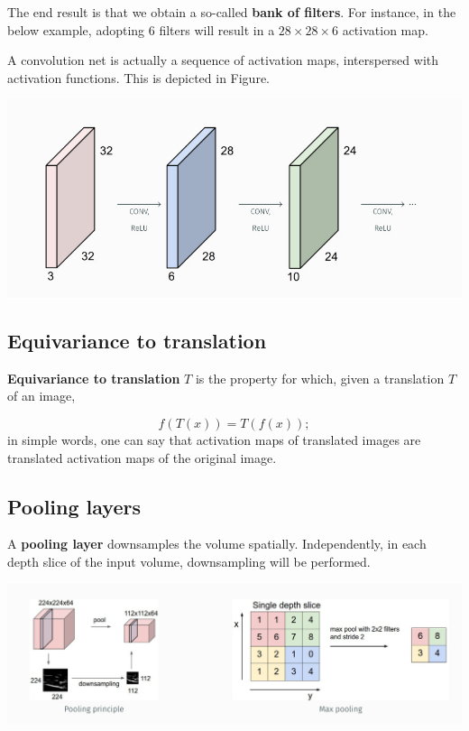 \documentclass[10pt]{report}
\begin{document}
The end result is that we obtain a so-called \textbf{bank of filters}. For
instance, in the below example, adopting \(6\) filters will result in a
\(28 \times 28 \times 6\) activation map.

A convolution net is actually a sequence of activation maps,
interspersed with activation functions. This is depicted in Figure.

\begin{center}
\includegraphics[width=.9\linewidth]{./pics/cnn/conv-layers-3.jpg}
\end{center}

\subsection{Equivariance to translation}
\label{sec:org80790ee}
\textbf{Equivariance to translation} \(T\) is the property for which, given a translation \(T\) of an image,

\[f(T(x)) = T(f(x));\] in simple words, one can say that activation maps of translated images are translated activation maps of the original image.

\subsection{Pooling layers}
\label{pooling-layers}
A \textbf{pooling layer} downsamples the volume spatially. Independently, in
each depth slice of the input volume, downsampling will be performed.

\begin{center}
\includegraphics[width=.9\linewidth]{./pics/cnn/pooling-layers.jpg}
\end{center}
\end{document}
